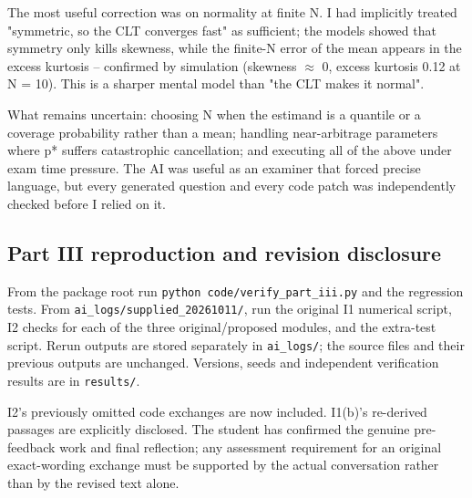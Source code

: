 The most useful correction was on normality at finite N. I had implicitly
treated "symmetric, so the CLT converges fast" as sufficient; the models
showed that symmetry only kills skewness, while the finite-N error of the mean
appears in the excess kurtosis -- confirmed by simulation (skewness $\approx$ 0,
excess kurtosis 0.12 at N = 10). This is a sharper mental model than "the CLT
makes it normal".

What remains uncertain: choosing N when the estimand is a quantile or a
coverage probability rather than a mean; handling near-arbitrage parameters
where p* suffers catastrophic cancellation; and executing all of the above
under exam time pressure. The AI was useful as an examiner that forced precise
language, but every generated question and every code patch was independently
checked before I relied on it.

\subsection*{Part III reproduction and revision disclosure}
From the package root run \texttt{python code/verify\_part\_iii.py} and the regression tests. From \texttt{ai\_logs/supplied\_20261011/}, run the original I1 numerical script, I2 checks for each of the three original/proposed modules, and the extra-test script. Rerun outputs are stored separately in \texttt{ai\_logs/}; the source files and their previous outputs are unchanged. Versions, seeds and independent verification results are in \texttt{results/}.

I2's previously omitted code exchanges are now included. I1(b)'s re-derived passages are explicitly disclosed. The student has confirmed the genuine pre-feedback work and final reflection; any assessment requirement for an original exact-wording exchange must be supported by the actual conversation rather than by the revised text alone.
